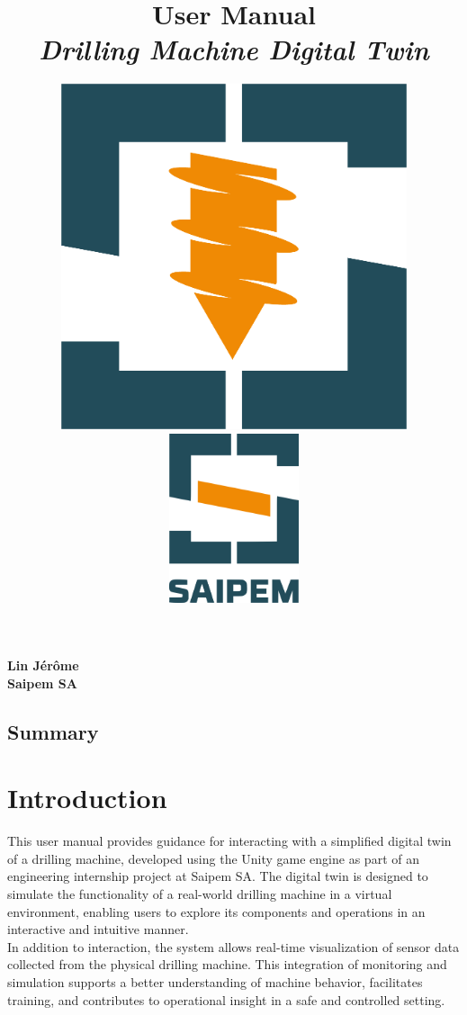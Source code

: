 \documentclass{article}
\title{\textbf{User Manual}\\
\textbf{\textit{Drilling Machine Digital Twin}}}
\author{
    \begin{minipage}[c]{\textwidth}
        \centering
        \includegraphics[width=4in]{DrillingMachineDigitaTwinLogo.png} \\
        \vspace{2cm}
        \includegraphics[width=1.5in]{SaipemLogo.png}
    \end{minipage}
}
\date{}
\begin{document}
\maketitle

\vfill
\begin{center}
    \textbf{Lin Jérôme}\\
    \textbf{Saipem SA}
\end{center}






\subsection*{Summary}
\tableofcontents





\newpage
\section{Introduction}\hfill

This user manual provides guidance for interacting with a simplified digital twin of a drilling machine, developed using the Unity game engine as part of an engineering internship project at Saipem SA. The digital twin is designed to simulate the functionality of a real-world drilling machine in a virtual environment, enabling users to explore its components and operations in an interactive and intuitive manner.\\

In addition to interaction, the system allows real-time visualization of sensor data collected from the physical drilling machine. This integration of monitoring and simulation supports a better understanding of machine behavior, facilitates training, and contributes to operational insight in a safe and controlled setting.





\newpage
\end{document}
